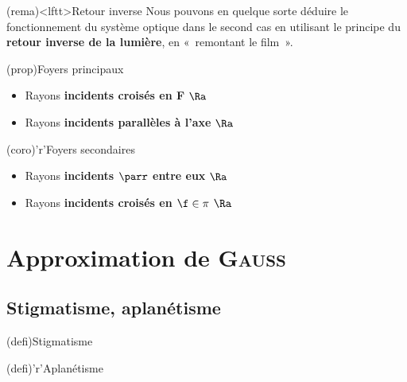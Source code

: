 \documentclass[../../main/main.tex]{subfiles}
\begin{document}
\begin{tcb}[label=rema:retinv](rema)<lftt>{Retour inverse}
	Nous pouvons en quelque sorte déduire le fonctionnement du système
	optique dans le second cas en utilisant le principe du \textbf{retour
		inverse de la lumière}, en «~remontant le film~».
\end{tcb}
\begin{tcbraster}[raster multicolumn=2]
	\begin{tcb*}[label=prop:foy](prop){Foyers principaux}
		\begin{itemize}[label=$\diamond$, leftmargin=10pt]
			\item Rayons \textbf{incidents croisés en F} $\Ra$ %
			\item Rayons \textbf{incidents parallèles à l'axe} $\Ra$ %
		\end{itemize}
	\end{tcb*}
	\begin{tcb*}[label=coro:foysec](coro)'r'{Foyers secondaires}
		\begin{itemize}[label=$\diamond$, leftmargin=10pt]
			\item Rayons \textbf{incidents $\parr$ entre eux} $\Ra$ %
			\item Rayons \textbf{incidents croisés en $\f \in \pi$} $\Ra$ %
		\end{itemize}
	\end{tcb*}
\end{tcbraster}

\section{Approximation de \textsc{Gauss}}

\subsection{Stigmatisme, aplanétisme}

\begin{tcbraster}[raster columns=2, raster equal height=rows]
	\begin{tcb*}[label=def:stig](defi){Stigmatisme}
	\end{tcb*}
	\begin{tcb*}[label=def:apla](defi)'r'{Aplanétisme}
	\end{tcb*}
\end{tcbraster}
\end{document}
